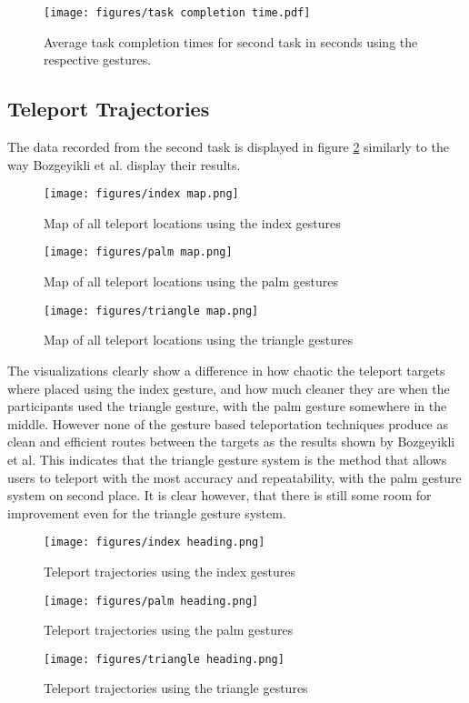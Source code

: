 \begin{figure}[!ht]
    \centering
    \texttt{[image: figures/task completion time.pdf]}
    \caption{Average task completion times for second task in seconds using the respective gestures.}
    \label{fig:ueqIndex}
\end{figure}

\subsection{Teleport Trajectories}
The data recorded from the second task is displayed in figure \ref{fig:exp2maps} similarly to the way Bozgeyikli et al. %
display their results. 

\begin{figure}[!htb]
        \texttt{[image: figures/index map.png]}
        \caption{Map of all teleport locations using the index gestures}\label{fig:map_index}
    \endminipage\hfill
        \texttt{[image: figures/palm map.png]}
        \caption{Map of all teleport locations using the palm gestures}\label{fig:map_palm}
    \endminipage\hfill
        \texttt{[image: figures/triangle map.png]}
        \caption{Map of all teleport locations using the triangle gestures}\label{fig:map_triangle}
        \label{fig:exp2maps}
    \endminipage
\end{figure}
    
The visualizations clearly show a difference in how chaotic the teleport targets where placed using the index gesture, and how much cleaner they are when the participants used the triangle gesture, with the palm gesture somewhere in the middle. However none of the gesture based teleportation techniques produce as clean and efficient routes between the targets as the results shown by Bozgeyikli et al. This indicates that the triangle gesture system is the method that allows users to teleport with the most accuracy and repeatability, with the palm gesture system on second place. It is clear however, that there is still some room for improvement even for the triangle gesture system. 

\begin{figure}[!htb]
        \texttt{[image: figures/index heading.png]}
        \caption{Teleport trajectories using the index gestures}\label{fig:map_index2}
    \endminipage\hfill
        \texttt{[image: figures/palm heading.png]}
        \caption{Teleport trajectories using the palm gestures}\label{fig:map_palm2}
    \endminipage\hfill
        \texttt{[image: figures/triangle heading.png]}
        \caption{Teleport trajectories using the triangle gestures}\label{fig:map_triangle2}
    \endminipage
\end{figure}

